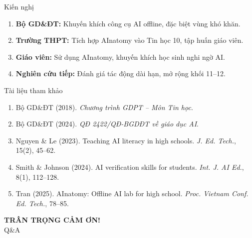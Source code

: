 \documentclass[10pt, aspectratio=169]{beamer}
\begin{document}
\begin{frame}{Kiến nghị}
    \begin{enumerate}
        \item \textbf{Bộ GD\&ĐT:} Khuyến khích công cụ AI offline, đặc biệt vùng khó khăn.
        \item \textbf{Trường THPT:} Tích hợp AInatomy vào Tin học 10, tập huấn giáo viên.
        \item \textbf{Giáo viên:} Sử dụng AInatomy, khuyến khích học sinh nghi ngờ AI.
        \item \textbf{Nghiên cứu tiếp:} Đánh giá tác động dài hạn, mở rộng khối 11--12.
    \end{enumerate}
\end{frame}

\begin{frame}{Tài liệu tham khảo}
    \small
    \begin{enumerate}
        \item Bộ GD\&ĐT (2018). \textit{Chương trình GDPT -- Môn Tin học}.
        \item Bộ GD\&ĐT (2024). \textit{QĐ 2422/QĐ-BGDĐT về giáo dục AI}.
        \item Nguyen \& Le (2023). Teaching AI literacy in high schools. \textit{J. Ed. Tech.}, 15(2), 45--62.
        \item Smith \& Johnson (2024). AI verification skills for students. \textit{Int. J. AI Ed.}, 8(1), 112--128.
        \item Tran (2025). AInatomy: Offline AI lab for high school. \textit{Proc. Vietnam Conf. Ed. Tech.}, 78--85.
    \end{enumerate}
\end{frame}

\begin{frame}[plain]
    \centering
    \vspace{1cm}
    
    \vspace{1.5cm}
    {\Huge \bfseries \color{PrimaryBlue} TRÂN TRỌNG CẢM ƠN!}\\
    \vspace{0.5cm}
    {\Large Q\&A}
\end{frame}
\end{document}
